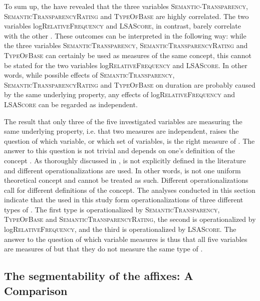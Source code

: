 To sum up, the  have revealed that the three variables \textsc{Semantic-Transparency}, \textsc{SemanticTransparencyRating} and \textsc{TypeOfBase} are highly correlated. The two variables log\textsc{RelativeFrequency} and \textsc{LSAScore}, in contrast, barely correlate with the other .
These outcomes can be interpreted in the following way: while the three variables  \textsc{SemanticTransparency}, \textsc{SemanticTransparencyRating} and \textsc{TypeOfBase} can certainly be used as measures of the same concept, this cannot be stated for the two variables log\textsc{RelativeFrequency} and \textsc{LSAScore}. In other words,  while possible effects of \textsc{SemanticTransparency}, \textsc{SemanticTransparencyRating} and \textsc{TypeOfBase} on duration are probably caused by the same underlying property, any effects of log\textsc{RelativeFrequency} and \textsc{LSAScore} can be regarded as independent.


The result that only three of the five investigated variables are measuring the same underlying property, i.e. that two measures are independent, raises the question of which variable, or which set of variables, is the right measure of .
The answer to this question is not trivial and depends on one's definition of the concept . As thoroughly discussed in ,  is not explicitly defined in the literature and different operationalizations are used. In other words,  is not one uniform theoretical concept and cannot be treated as such. Different operationalizations call for different definitions of the concept. 
The analyses conducted in this section indicate that the  used in this study form operationalizations of three different types of . The first type is operationalized by \textsc{SemanticTransparency}, \textsc{TypeOfBase} and \textsc{SemanticTransparencyRating}, the second is operationalized by log\textsc{RelativeFrequency}, and the third is operationalized by \textsc{LSAScore}.
The answer to the question of which variable measures  is thus that all five variables are measures of  but that they do not measure the same type of . 

 

\subsection{The segmentability of the affixes: A Comparison}
\label{The decomposability of the four affixes: a comparison}

